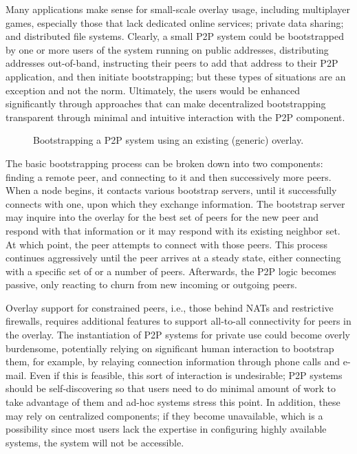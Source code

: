 \documentclass[conference]{IEEEtran}
\begin{document}
Many applications make sense for small-scale overlay usage, including
multiplayer games, especially those that lack dedicated online services;
private data sharing; and distributed file systems.  Clearly, a small P2P
system could be bootstrapped by one or more users of the system running on
public addresses, distributing addresses out-of-band, instructing their peers
to add that address to their P2P application, and then initiate bootstrapping;
but these types of situations are an exception and not the norm.  Ultimately,
the users would be enhanced significantly through approaches that can make
decentralized bootstrapping transparent through minimal and intuitive
interaction with the P2P component.

\begin{figure*}[h!t!]
\centering
{}
\caption{Bootstrapping a P2P system using an existing (generic) overlay.}
\label{fig:bootstrap}
\end{figure*}

The basic bootstrapping process can be broken down into two components: finding
a remote peer, and connecting to it and then successively more peers.  When a
node begins, it contacts various bootstrap servers, until it successfully
connects with one, upon which they exchange information.  The bootstrap server
may inquire into the overlay for the best set of peers for the new peer and
respond with that information or it may respond with its existing neighbor set.
At which point, the peer attempts to connect with those peers.  This process
continues aggressively until the peer arrives at a steady state, either
connecting with a specific set of or a number of peers.  Afterwards, the P2P
logic becomes passive, only reacting to churn from new incoming or outgoing
peers.

Overlay support for constrained peers, i.e., those behind NATs and restrictive
firewalls, requires additional features to support all-to-all connectivity for
peers in the overlay.  The instantiation of P2P systems for private use could
become overly burdensome, potentially relying on significant human interaction
to bootstrap them, for example, by relaying connection information through
phone calls and e-mail.  Even if this is feasible, this sort of interaction is
undesirable; P2P systems should be self-discovering so that users need to do
minimal amount of work to take advantage of them and ad-hoc systems stress this
point.  In addition, these may rely on centralized components; if they become
unavailable, which is a possibility since most users lack the expertise in
configuring highly available systems, the system will not be accessible.
\end{document}
